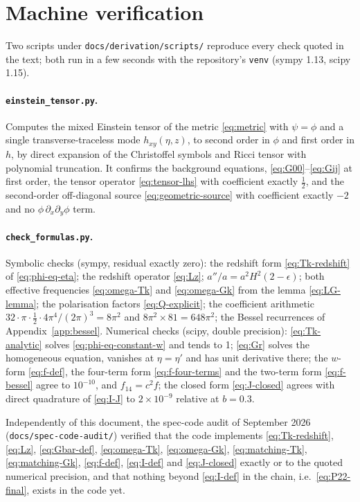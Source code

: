 \documentclass[11pt,a4paper]{article}
\newcommand{\eps}{\epsilon}
\theoremstyle{remark}
\begin{document}
\section{Machine verification}
\label{app:verification}

Two scripts under \texttt{docs/derivation/scripts/} reproduce every check quoted in the text; both run in a few seconds with the repository's \texttt{venv} (sympy 1.13, scipy 1.15).

\paragraph{\texttt{einstein\_tensor.py}.} Computes the mixed Einstein tensor of the metric \eqref{eq:metric} with $\psi = \phi$ and a single transverse-traceless mode $h_{xy}(\eta,z)$, to second order in $\phi$ and first order in $h$, by direct expansion of the Christoffel symbols and Ricci tensor with polynomial truncation. It confirms the background equations, \eqref{eq:G00}--\eqref{eq:Gij} at first order, the tensor operator \eqref{eq:tensor-lhs} with coefficient exactly $\tfrac12$, and the second-order off-diagonal source \eqref{eq:geometric-source} with coefficient exactly $-2$ and no $\phi\,\partial_x\partial_y\phi$ term.

\paragraph{\texttt{check\_formulas.py}.} Symbolic checks (sympy, residual exactly zero): the redshift form \eqref{eq:Tk-redshift} of \eqref{eq:phi-eq-eta}; the redshift operator \eqref{eq:Lz}; $a''/a = a^2H^2(2-\eps)$; both effective frequencies \eqref{eq:omega-Tk} and \eqref{eq:omega-Gk} from the lemma \eqref{eq:LG-lemma}; the polarisation factors \eqref{eq:Q-explicit}; the coefficient arithmetic $32\cdot\pi\cdot\tfrac12\cdot4\pi^4/(2\pi)^3 = 8\pi^2$ and $8\pi^2\times81 = 648\pi^2$; the Bessel recurrences of Appendix~\ref{app:bessel}. Numerical checks (scipy, double precision): \eqref{eq:Tk-analytic} solves \eqref{eq:phi-eq-constant-w} and tends to 1; \eqref{eq:Gr} solves the homogeneous equation, vanishes at $\eta=\eta'$ and has unit derivative there; the $w$-form \eqref{eq:f-def}, the four-term form \eqref{eq:f-four-terms} and the two-term form \eqref{eq:f-bessel} agree to $10^{-10}$, and $f_{14} = c^2 f$; the closed form \eqref{eq:J-closed} agrees with direct quadrature of \eqref{eq:I-J} to $2\times10^{-9}$ relative at $b = 0.3$.

Independently of this document, the spec-code audit of September 2026 (\texttt{docs/spec-code-audit/}) verified that the code implements \eqref{eq:Tk-redshift}, \eqref{eq:Lz}, \eqref{eq:Gbar-def}, \eqref{eq:omega-Tk}, \eqref{eq:omega-Gk}, \eqref{eq:matching-Tk}, \eqref{eq:matching-Gk}, \eqref{eq:f-def}, \eqref{eq:I-def} and \eqref{eq:J-closed} exactly or to the quoted numerical precision, and that nothing beyond \eqref{eq:I-def} in the chain, i.e.\ \eqref{eq:P22-final}, exists in the code yet.
\end{document}
